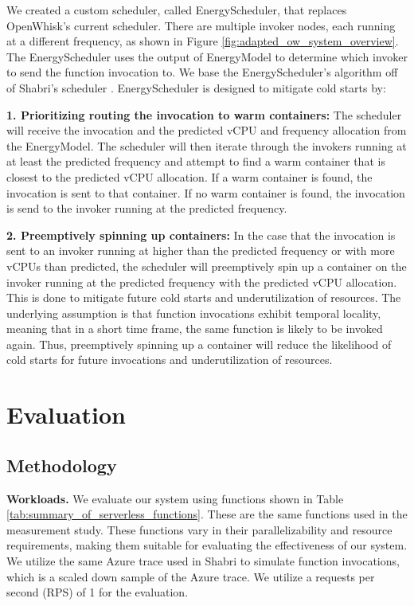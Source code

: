 \documentclass[times, 10pt,twocolumn]{article}
\begin{document}
We created a custom scheduler, called EnergyScheduler, that replaces OpenWhisk's current scheduler. There are multiple invoker nodes, each running at a different frequency, as shown in Figure \ref{fig:adapted_ow_system_overview}. The EnergyScheduler uses the output of EnergyModel to determine which invoker to send the function invocation to. We base the EnergyScheduler's algorithm off of Shabri's scheduler \cite{sinha2024shabari}. EnergyScheduler is designed to mitigate cold starts by:

\textbf{1. Prioritizing routing the invocation to warm containers: } The scheduler will receive the invocation and the predicted vCPU and frequency allocation from the EnergyModel. The scheduler will then iterate through the invokers running at at least the predicted frequency and attempt to find a warm container that is closest to the predicted vCPU allocation. If a warm container is found, the invocation is sent to that container. If no warm container is found, the invocation is send to the invoker running at the predicted frequency.

\textbf{2. Preemptively spinning up containers: } In the case that the invocation is sent to an invoker running at higher than the predicted frequency or with more vCPUs than predicted, the scheduler will preemptively spin up a container on the invoker running at the predicted frequency with the predicted vCPU allocation. This is done to mitigate future cold starts and underutilization of resources. The underlying assumption is that function invocations exhibit temporal locality, meaning that in a short time frame, the same function is likely to be invoked again. Thus, preemptively spinning up a container will reduce the likelihood of cold starts for future invocations and underutilization of resources.

\section{Evaluation}

\subsection{Methodology}
\textbf{Workloads.} We evaluate our system using functions shown in Table \ref{tab:summary_of_serverless_functions}. These are the same functions used in the measurement study. These functions vary in their parallelizability and resource requirements, making them suitable for evaluating the effectiveness of our system. We utilize the same Azure trace used in Shabri \cite{sinha2024shabari} to simulate function invocations, which is a scaled down sample of the Azure trace. We utilize a requests per second (RPS) of 1 for the evaluation.
\end{document}
